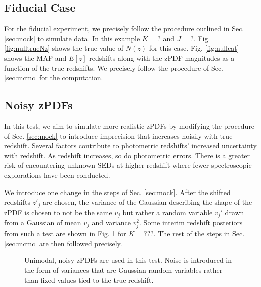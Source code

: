 \documentclass[preprint]{aastex}
\begin{document}
\clearpage
\subsection{Fiducial Case}
\label{sec:null}

For the fiducial experiment, we precisely follow the procedure outlined in Sec. 
\ref{sec:mock} to simulate data.  In this example $K=?$ and $J=?$.  Fig. 
\ref{fig:nulltrueNz} shows the true value of $N(z)$ for this case.  Fig. 
\ref{fig:nullcat} shows the MAP and $E[z]$ redshifts along with the zPDF 
magnitudes as a function of the true redshifts.  We precisely follow the 
procedure of Sec. \ref{sec:mcmc} for the computation.  


\clearpage
\subsection{Noisy zPDFs}
\label{sec:noisy}

In this test, we aim to simulate more realistic zPDFs by modifying the 
procedure of Sec. \ref{sec:mock} to introduce imprecision that increases 
noisily with true redshift.  Several factors contribute to photometric 
redshifts' increased uncertainty with redshift.  As redshift increases, so do 
photometric errors.  There is a greater risk of encountering unknown SEDs at 
higher redshift where fewer spectroscopic explorations have been conducted.  

We introduce one change in the steps of Sec. \ref{sec:mock}.  After the shifted 
redshifts $z'_{j}$ are chosen, the variance of the Gaussian describing the 
shape of the zPDF is chosen to not be the same $v_{j}$ but rather a random 
variable $v_{j}'$ drawn from a Gaussian of mean $v_{j}$ and variance 
$v_{j}^{2}$.  Some interim redshift posteriors from such a test are shown in 
Fig. \ref{fig:noisypzs} for $K=???$.  The rest of the steps in Sec. 
\ref{sec:mcmc} are then followed precisely.

\begin{figure}
\caption{Unimodal, noisy zPDFs are used in this test.  Noise is introduced in 
the form of variances that are Gaussian random variables rather than fixed 
values tied to the true redshift.}
\label{fig:noisypzs}
\end{figure}
\end{document}

